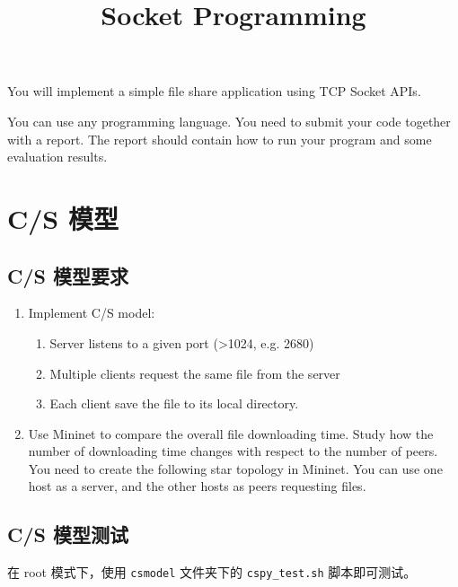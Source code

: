 \endofdump
{}

\title{Socket Programming}
\maketitle
\tableofcontents

\vfill
You will implement a simple file share application using TCP Socket APIs. 

You can use any programming language. You need to submit your code together with a report. The report should contain how to run your program and some evaluation results.
\vfill
\clearpage
\section{C/S 模型}

\subsection{C/S 模型要求}

\begin{enumerate}
    \item Implement C/S model: 
    \begin{enumerate}
        \item Server listens to a given port (>1024, e.g. 2680)
        \item Multiple clients request the same file from the server
        \item Each client save the file to its local directory.
    \end{enumerate}
    \item Use Mininet to compare the overall file downloading time. Study how the number of downloading time changes with respect to the number of peers. You need to create the following star topology in Mininet. You can use one host as a server, and the other hosts as peers requesting files.
    \begin{figure}[H]
        \centering
        
    \end{figure}
\end{enumerate}

\subsection{C/S 模型测试}

在 root 模式下，使用 \verb"csmodel" 文件夹下的 \verb"cspy_test.sh" 脚本即可测试。

